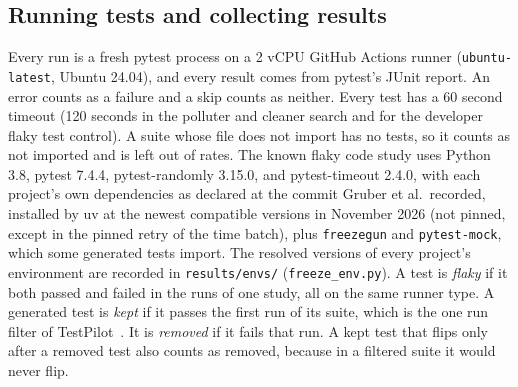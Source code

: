 \subsection{Running tests and collecting results}
\label{sec:collect}
Every run is a fresh pytest process on a 2 vCPU GitHub Actions runner (\texttt{ubuntu-latest}, Ubuntu 24.04), and every result comes from pytest's JUnit report. An error counts as a failure and a skip counts as neither. Every test has a 60 second timeout (120 seconds in the polluter and cleaner search and for the developer flaky test control). A suite whose file does not import has no tests, so it counts as not imported and is left out of rates. The known flaky code study uses Python 3.8, pytest 7.4.4, pytest-randomly 3.15.0, and pytest-timeout 2.4.0, with each project's own dependencies as declared at the commit Gruber et al.\ recorded, installed by uv at the newest compatible versions in November 2026 (not pinned, except in the pinned retry of the time batch), plus \texttt{freezegun} and \texttt{pytest-mock}, which some generated tests import. The resolved versions of every project's environment are recorded in \texttt{results/envs/} (\texttt{freeze\_env.py}). A test is \emph{flaky} if it both passed and failed in the runs of one study, all on the same runner type. A generated test is \emph{kept} if it passes the first run of its suite, which is the one run filter of TestPilot~\cite{schafer2024}. It is \emph{removed} if it fails that run. A kept test that flips only after a removed test also counts as removed, because in a filtered suite it would never flip.
